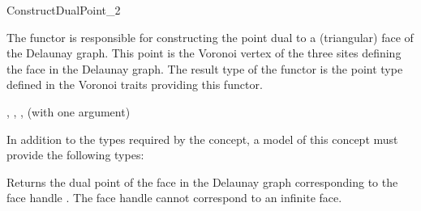 

\begin{ccRefFunctionObjectConcept}{ConstructDualPoint_2}

The functor  is responsible for constructing
the point dual to a (triangular) face of the Delaunay graph. This
point is the Voronoi vertex of the three sites defining the face in
the Delaunay graph. The result type of the functor is the point type
defined in the Voronoi traits providing this functor.

\ccRefines
{}, , ,
 (with one argument)

\ccTypes

In addition to the types required by the 
concept, a model of this concept must provide the following types:



\ccOperations

\ccThreeToTwo
{}
{Returns the dual point of the face in the Delaunay graph
  corresponding to the face handle . The face handle 
  cannot correspond to an infinite face.}
%


\end{ccRefFunctionObjectConcept}

